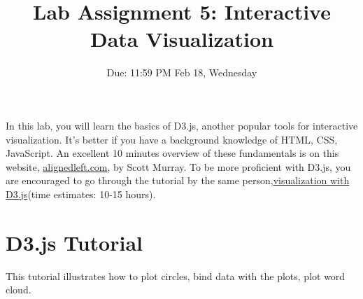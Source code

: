 \documentclass[a4paper, 11pt]{article}
\title{ Lab Assignment 5: Interactive Data Visualization}
\author{Due: 11:59 PM Feb 18, Wednesday }
\date{}
\begin{document}
\maketitle
In this lab, you will learn the basics of D3.js, another popular tools for interactive visualization. It's better if you have a background knowledge of HTML, CSS, JavaScript. An excellent 10 minutes overview of these fundamentals is on this website, \href{http://alignedleft.com/tutorials/d3/fundamentals}{alignedleft.com}, by Scott Murray. To be more proficient with D3.js, you are encouraged to go through the tutorial by the same person,\href{http://alignedleft.com/tutorials/d3}{visualization with D3.js}(time estimates: 10-15 hours).

\section{D3.js Tutorial}
This tutorial illustrates how to plot circles, bind data with the plots, plot word cloud. 
\end{document}
